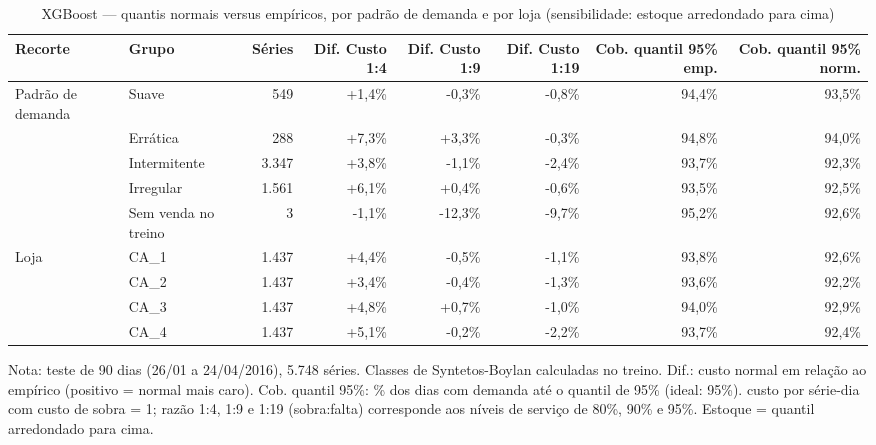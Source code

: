 \begin{table}[htbp]
\centering
\small
\caption{XGBoost — quantis normais versus empíricos, por padrão de demanda e por loja (sensibilidade: estoque arredondado para cima)}
\label{tab:xgb_empirico_vs_normal_por_grupo_sensibilidade}
\begin{tabular}{llrrrrrr}
\toprule
Recorte & Grupo & Séries & Dif. Custo 1:4 & Dif. Custo 1:9 & Dif. Custo 1:19 & Cob. quantil 95\% emp. & Cob. quantil 95\% norm. \\
\midrule
Padrão de demanda & Suave & 549 & +1,4\% & -0,3\% & -0,8\% & 94,4\% & 93,5\% \\
 & Errática & 288 & +7,3\% & +3,3\% & -0,3\% & 94,8\% & 94,0\% \\
 & Intermitente & 3.347 & +3,8\% & -1,1\% & -2,4\% & 93,7\% & 92,3\% \\
 & Irregular & 1.561 & +6,1\% & +0,4\% & -0,6\% & 93,5\% & 92,5\% \\
 & Sem venda no treino & 3 & -1,1\% & -12,3\% & -9,7\% & 95,2\% & 92,6\% \\
\addlinespace
Loja & CA\_1 & 1.437 & +4,4\% & -0,5\% & -1,1\% & 93,8\% & 92,6\% \\
 & CA\_2 & 1.437 & +3,4\% & -0,4\% & -1,3\% & 93,6\% & 92,2\% \\
 & CA\_3 & 1.437 & +4,8\% & +0,7\% & -1,0\% & 94,0\% & 92,9\% \\
 & CA\_4 & 1.437 & +5,1\% & -0,2\% & -2,2\% & 93,7\% & 92,4\% \\
\bottomrule
\end{tabular}
\par\smallskip
{\footnotesize Nota: teste de 90 dias (26/01 a 24/04/2016), 5.748 séries. Classes de Syntetos-Boylan calculadas no treino. Dif.: custo normal em relação ao empírico (positivo = normal mais caro). Cob. quantil 95\%: \% dos dias com demanda até o quantil de 95\% (ideal: 95\%). custo por série-dia com custo de sobra = 1; razão 1:4, 1:9 e 1:19 (sobra:falta) corresponde aos níveis de serviço de 80\%, 90\% e 95\%. Estoque = quantil arredondado para cima.}
\end{table}
